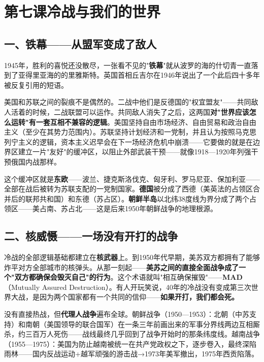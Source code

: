 \documentclass[a4paper,12pt]{ctexart}
\begin{document}
\newpage

\section{\textcolor{orange!80!black}{第七课\quad 冷战与我们的世界}}

\subsection*{一、铁幕——从盟军变成了敌人}

1945年，胜利的喜悦还没散尽，一张看不见的"\textbf{铁幕}"就从波罗的海的什切青一直落到了亚得里亚海的的里雅斯特。英国首相丘吉尔在1946年说出了一个此后四十多年被反复引用的短语。

美国和苏联之间的裂痕不是偶然的。二战中他们是反德国的"权宜盟友"——共同敌人活着的时候，二战联盟可以运作。共同敌人消失了之后，这两国\textbf{对"世界应该怎么运转"有一套互相不兼容的逻辑}。美国坚持自由市场经济、自由贸易和政治自由主义（至少在其势力范围内）。苏联坚持计划经济和一党制，并且认为按照马克思列宁主义的逻辑，资本主义迟早会在下一场经济危机中崩溃——它要做的就是在边界区建立一片"友好"的缓冲区，以阻止外部武装干预——就像1918—1920年列强干预俄国内战那样。

这个缓冲区就是\textbf{东欧}——波兰、捷克斯洛伐克、匈牙利、罗马尼亚、保加利亚——全部在战后被转为苏联支配的一党制国家。\textbf{德国}被分成了西德（美英法的占领区合并后的联邦共和国）和东德（苏占区）。\textbf{朝鲜半岛}以北纬38度线为界分成了两个占领区——美占南、苏占北——这是后来1950年朝鲜战争的地理根源。

\subsection*{二、核威慑——一场没有开打的战争}

冷战的全部逻辑基础都建立在\textbf{核武器}上。到1950年代早期，美苏双方都拥有了能够炸平对方全部城市的核弹头。从那一刻起——\textbf{美苏之间的直接全面战争成了一个"双方都确保会毁灭自己"的行为}。这个术语就叫"相互确保摧毁"——\textbf{MAD}（Mutually Assured Destruction）。有人开玩笑说，40年的冷战没有变成第三次世界大战，是因为两个国家都有一个共同的信仰——\textbf{如果开打，我们都会死。}

没有直接热战，但\textbf{代理人战争}遍布全球。朝鲜战争（1950—1953）：北朝（中苏支持）和南朝（美国领导的联合国军）在一条三年前画出来的军事分界线两边互相厮杀，约三百万人死伤——战线最终几乎回到了战争开始时的那条纬度线。越南战争（1955—1975）：美国为防止越南被统一在共产党政权之下，逐步卷入，最终深陷雨林——国内反战运动+越军顽强的游击战→1973年美军撤出，1975年西贡陷落。
\end{document}
